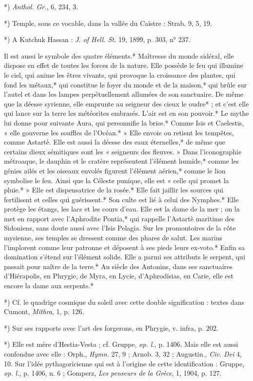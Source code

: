 \documentclass[a4paper, 11pt, oneside, polutonikogreek, french]{article}
\begin{document}
*) \emph{Anthol. Gr.}, 6, 234, 3.

*) Temple, sous ce vocable, dans la vallée du Caïstre : Strab. 9, 5, 19.

*) A Kutchuk Hassan : \emph{J. of Hell. St.} 19, 1899, p. 303, n° 237.

Il est aussi le symbole des quatre éléments.* Maîtresse du monde sidéral, elle dispose en effet de toutes les forces de la nature. Elle possède le feu qui illumine le ciel, qui anime les êtres vivants, qui provoque la croissance des plantes, qui fond les métaux,* qui constitue le foyer du monde et de la maison,* qui brûle sur l'autel et dans les lampes perpétuellement allumées de son sanctuaire. De même que la déesse syrienne, elle emprunte au seigneur des cieux le oudre* ; et c'est elle qui lance sur la terre les météorites embrasés. L'air est en son pouvoir.* Le mythe lui donne pour suivante Aura, qui personnifie la brise.* Comme Isis et Caelestis, « elle gouverne les souffles de l'Océan.* » Elle envoie ou retient les tempêtes, comme Astartè. Elle est aussi la déesse des eaux éternelles,* de même que certains dieux sémitiques sont les « seigneurs des fleuves. » Dans l'iconographie métroaque, le dauphin et le cratère représentent l'élément humide,* comme les génies ailés et les oiseaux envolés figurent l'élément aérien,* comme le lion symbolise le feu. Ainsi que la Céleste punique, elle est « celle qui promet la pluie.* » Elle est dispensatrice de la rosée.* Elle fait jaillir les sources qui fertilisent et celles qui guérissent.* Son culte est lié à celui des Nymphes.* Elle protège les étangs, les lacs et les cours d'eau. Elle est la dame de la mer ; on la met en rapport avec l'Aphrodite Pontia,* qui rappelle l'Astartè maritime des Sidoniens, sans doute aussi avec l'Isis Pelagia. Sur les promontoires de la côte mysienne, ses temples se dressent comme des phares de salut. Les marins l'implorent comme leur patronne et déposent à ses pieds leurs ex-voto.* Enfin sa domination s'étend sur l'élément solide. Elle a parmi ses attributs le serpent, qui passait pour naître de la terre.* Au siècle des Antonins, dans ses sanctuaires d'Hiérapolis, en Phrygie, de Myra, en Lycie, d'Aphrodisias, en Carie, elle est encore la dame aux serpents.*

*) Cf. le quadrige cosmique du soleil avec cette double signification : textes dans Cumont, \emph{Mithra}, 1, p. 126.

*) Sur ses rapports avec l'art des forgerons, en Phrygie, v. infra, p. 202.

*) Elle est mère d'Hestia-Vesta ; cf. Gruppe, \emph{op. l.}, p. 1406. Mais elle est aussi confondue avec elle : Orph., \emph{Hymn.} 27, 9 ; Arnob. 3, 32 ; Augustin., \emph{Civ. Dei} 4, 10. Sur l'idée pythagoricienne qui est à l'origine de cette identification : Gruppe, \emph{op. l.}, p. 1406, n. 6 ; Gomperz, \emph{Les penseurs de la Grèce}, 1, 1904, p. 127.
\end{document}
